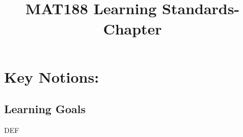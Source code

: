 \documentclass[12pt,oneside,english]{Learning_Standards_Revised/matchapter}
\numberwithin{equation}{section}
\numberwithin{figure}{section}
\newif\ifshowSoln
\begin{document}
	
\title{
	\textbf{	 \\ MAT188 Learning Standards-Chapter 
        }  
	\ifshowSoln
	and notes for instructors
	\else
{}
	\fi
}

\date{}

\maketitle

\section*{\color{blue} Key Notions: %
    }


\subsection*{Learning Goals}
    \begin{enumerate}
        
\end{enumerate}


\begin{shownto}{DEF}
\PrintSavedRender{}
\end{shownto}
\end{document}
